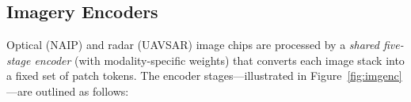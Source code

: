 \documentclass[remotesensing,article,accept,pdftex,moreauthors]{Definitions/mdpi}
\renewcommand{\hl}[1]{#1}
\begin{document}
\subsection{Imagery Encoders}
\label{sec:img_enc}



Optical (NAIP) and radar (UAVSAR) image chips are processed by a \emph{\hl{shared five-stage encoder}} (with modality-specific weights) that converts each image stack into a fixed set of patch tokens. The encoder stages—illustrated in Figure~\ref{fig:imgenc}—are outlined as follows:
\end{document}
